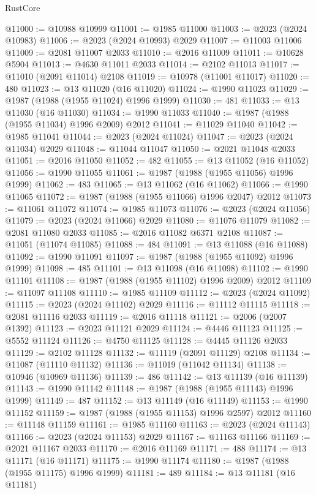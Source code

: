 \begin{lexlean}{RustCore}
\begin{coremodule}
@11000 := @10988 @10999
@11001 := @1985 @11000
@11003 := @2023 (@2024 @10983)
@11006 := @2023 (@2024 @10993) @2029
@11007 := @11003 @11006
@11009 := @2081 @11007 @2033
@11010 := @2016 @11009
@11011 := @10628 @5904
@11013 := @4630 @11011 @2033
@11014 := @2102 @11013
@11017 := @11010 (@2091 @11014) @2108
@11019 := @10978 (@11001 @11017)
@11020 := 480
@11023 := @13 @11020 (@16 @11020)
@11024 := @1990 @11023
@11029 := @1987 (@1988 (@1955 @11024) @1996 @1999)
@11030 := 481
@11033 := @13 @11030 (@16 @11030)
@11034 := @1990 @11033
@11040 := @1987 (@1988 (@1955 @11034) @1996 @2009) @2012
@11041 := @11029 @11040
@11042 := @1985 @11041
@11044 := @2023 (@2024 @11024)
@11047 := @2023 (@2024 @11034) @2029
@11048 := @11044 @11047
@11050 := @2021 @11048 @2033
@11051 := @2016 @11050
@11052 := 482
@11055 := @13 @11052 (@16 @11052)
@11056 := @1990 @11055
@11061 := @1987 (@1988 (@1955 @11056) @1996 @1999)
@11062 := 483
@11065 := @13 @11062 (@16 @11062)
@11066 := @1990 @11065
@11072 := @1987 (@1988 (@1955 @11066) @1996 @2047) @2012
@11073 := @11061 @11072
@11074 := @1985 @11073
@11076 := @2023 (@2024 @11056)
@11079 := @2023 (@2024 @11066) @2029
@11080 := @11076 @11079
@11082 := @2081 @11080 @2033
@11085 := @2016 @11082 @6371 @2108
@11087 := @11051 (@11074 @11085)
@11088 := 484
@11091 := @13 @11088 (@16 @11088)
@11092 := @1990 @11091
@11097 := @1987 (@1988 (@1955 @11092) @1996 @1999)
@11098 := 485
@11101 := @13 @11098 (@16 @11098)
@11102 := @1990 @11101
@11108 := @1987 (@1988 (@1955 @11102) @1996 @2009) @2012
@11109 := @11097 @11108
@11110 := @1985 @11109
@11112 := @2023 (@2024 @11092)
@11115 := @2023 (@2024 @11102) @2029
@11116 := @11112 @11115
@11118 := @2081 @11116 @2033
@11119 := @2016 @11118
@11121 := @2006 (@2007 @1392)
@11123 := @2023 @11121 @2029
@11124 := @4446 @11123
@11125 := @5552 @11124
@11126 := @4750 @11125
@11128 := @4445 @11126 @2033
@11129 := @2102 @11128
@11132 := @11119 (@2091 @11129) @2108
@11134 := @11087 (@11110 @11132)
@11136 := @11019 (@11042 @11134)
@11138 := @10946 (@10969 @11136)
@11139 := 486
@11142 := @13 @11139 (@16 @11139)
@11143 := @1990 @11142
@11148 := @1987 (@1988 (@1955 @11143) @1996 @1999)
@11149 := 487
@11152 := @13 @11149 (@16 @11149)
@11153 := @1990 @11152
@11159 := @1987 (@1988 (@1955 @11153) @1996 @2597) @2012
@11160 := @11148 @11159
@11161 := @1985 @11160
@11163 := @2023 (@2024 @11143)
@11166 := @2023 (@2024 @11153) @2029
@11167 := @11163 @11166
@11169 := @2021 @11167 @2033
@11170 := @2016 @11169
@11171 := 488
@11174 := @13 @11171 (@16 @11171)
@11175 := @1990 @11174
@11180 := @1987 (@1988 (@1955 @11175) @1996 @1999)
@11181 := 489
@11184 := @13 @11181 (@16 @11181)

\end{coremodule}
\end{lexlean}
